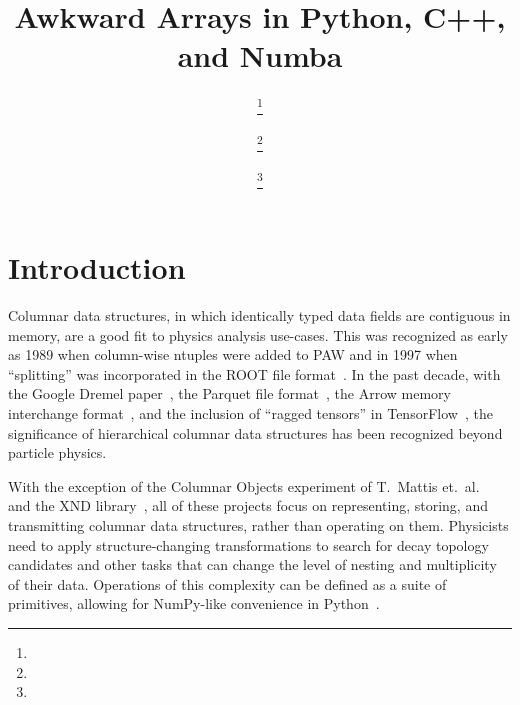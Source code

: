 \documentclass{webofc}
\begin{document}
\title{Awkward Arrays in Python, C++, and Numba}

\author{%
 \fnsep\thanks{} \and
{} \fnsep\thanks{} \and
{} \fnsep\thanks{}}



\maketitle

\section{Introduction}

Columnar data structures, in which identically typed data fields are contiguous in memory, are a good fit to physics analysis use-cases. This was recognized as early as 1989 when column-wise ntuples were added to PAW and in 1997 when ``splitting'' was incorporated in the ROOT file format~\cite{rootio-1997}. In the past decade, with the Google Dremel paper~\cite{dremel}, the Parquet file format~\cite{parquet}, the Arrow memory interchange format~\cite{arrow}, and the inclusion of ``ragged tensors'' in TensorFlow~\cite{tf-raggedtensor}, the significance of hierarchical columnar data structures has been recognized beyond particle physics.

With the exception of the Columnar Objects experiment of T.\ Mattis et.\ al.~\cite{columnar-objects} and the XND library~\cite{xnd-io}, all of these projects focus on representing, storing, and transmitting columnar data structures, rather than operating on them. Physicists need to apply structure-changing transformations to search for decay topology candidates and other tasks that can change the level of nesting and multiplicity of their data. Operations of this complexity can be defined as a suite of primitives, allowing for NumPy-like convenience in Python~\cite{chep-2018}.
\end{document}
